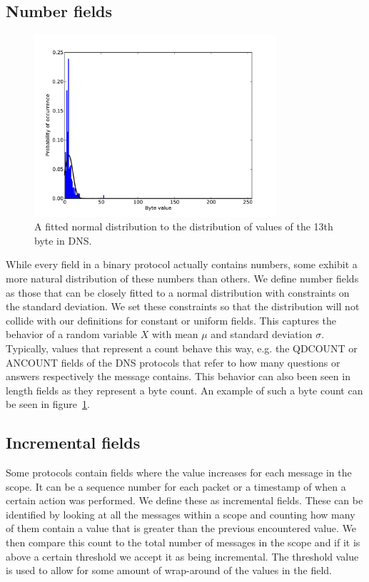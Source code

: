 \documentclass[a4paper]{report}
\begin{document}
\subsection{Number fields}

\begin{figure}[h]
    \centering
    \includegraphics[width=0.8\textwidth]{number}
    \captionsetup{width=0.8\textwidth}
    \caption{A fitted normal distribution to the distribution of values of the
    13th byte in DNS.}
    \label{fig:number}
\end{figure}

While every field in a binary protocol actually contains numbers, some exhibit
a more natural distribution of these numbers than others. We define number
fields as those that can be closely fitted to a normal distribution with
constraints on the standard deviation. We set these constraints so that the
distribution will not collide with our definitions for constant or uniform
fields. This captures the behavior of a random variable $X$ with mean $\mu$ and
standard deviation $\sigma$. Typically, values that represent a count behave
this way, e.g. the QDCOUNT or ANCOUNT fields of the DNS protocols that refer to
how many questions or answers respectively the message contains. This behavior
can also been seen in length fields as they represent a byte count. An example
of such a byte count can be seen in figure~\ref{fig:number}.

\subsection{Incremental fields}
Some protocols contain fields where the value increases for each message in the
scope. It can be a sequence number for each packet or a timestamp of when a
certain action was performed. We define these as incremental fields. These can
be identified by looking at all the messages within a scope and counting how
many of them contain a value that is greater than the previous encountered
value. We then compare this count to the total number of messages in the scope
and if it is above a certain threshold we accept it as being incremental. The
threshold value is used to allow for some amount of wrap-around of the values
in the field.
\end{document}
